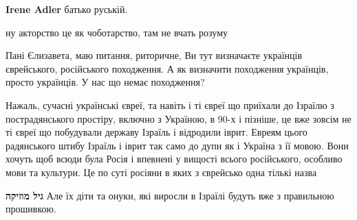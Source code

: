 \begin{itemize}
\begin{itemize}
\textbf{Irene Adler} батько руській.
\end{itemize}

 
ну акторство це як чоботарство, там не вчать розуму

 

Пані Єлизавета, маю питання, риторичне, Ви тут визначаєте українців
єврейського, російського походження. А як визначити походження українців,
просто українців. У нас що немає походження?


 

Нажаль, сучасні українські євреї, та навіть і ті євреї що приїхали до Ізраїлю з
пострадянського простіру, включно з Україною, в 90-х і пізніше, це вже зовсім
не ті євреї що побудували державу Ізраїль і відродили іврит. Евреям цього
радянського штибу Ізраїль і іврит так само до дупи як і Україна з її мовою.
Вони хочуть щоб всюди була Росія і впевнені у вищості всього російського,
особливо мови та культури. Це по суті росіяни в яких з єврейсько одна тількі
назва

\begin{itemize}
 
\textbf{גיל מוזיקה}
Але їх діти та онуки, які виросли в Ізраїлі будуть вже з правильною прошивкою.
\end{itemize}

 

\end{itemize}
